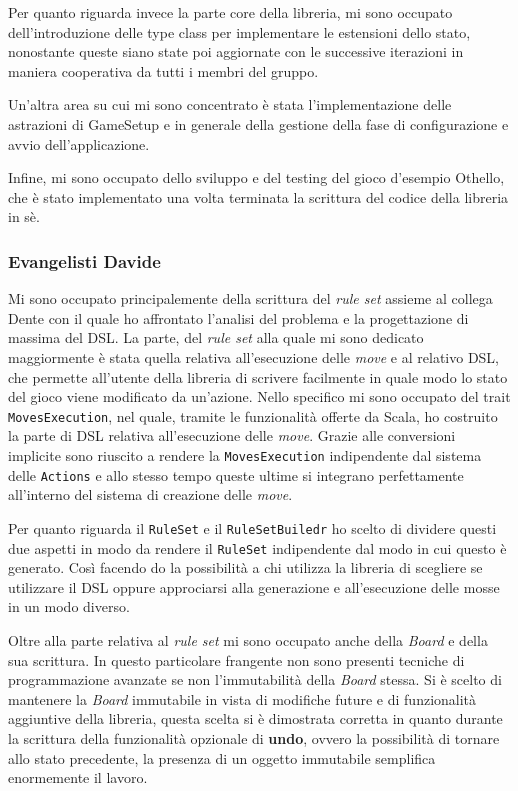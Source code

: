 Per quanto riguarda invece la parte core della libreria, mi sono occupato dell'in\-tro\-du\-zione delle type class per implementare le estensioni dello stato, nonostante queste siano state poi aggiornate con le successive iterazioni in maniera cooperativa da tutti i membri del gruppo.

Un'altra area su cui mi sono concentrato è stata l'implementazione delle astrazioni di GameSetup e in generale della gestione della fase di configurazione e avvio dell'ap\-pli\-ca\-zione.

Infine, mi sono occupato dello sviluppo e del testing del gioco d'esempio Othello, che è stato implementato una volta terminata la scrittura del codice della libreria in sè.

\subsubsection{Evangelisti Davide}
Mi sono occupato principalemente della scrittura del \textit{rule set} assieme al collega Dente con il quale ho affrontato l'analisi del problema e la progettazione di massima del DSL.
%
La parte, del \textit{rule set} alla quale mi sono dedicato maggiormente è stata quella relativa all'esecuzione delle \textit{move} e al relativo DSL, che permette all'utente della libreria di scrivere facilmente in quale modo lo stato del gioco viene modificato da un'azione.
%
Nello specifico mi sono occupato del trait \texttt{MovesExecution}, nel quale, tramite le funzionalità offerte da Scala, ho costruito la parte di DSL relativa all'esecuzione delle \textit{move}.
%
Grazie alle conversioni implicite sono riuscito a rendere la \texttt{MovesExecution} indipendente dal sistema delle \texttt{Actions} e allo stesso tempo queste ultime si integrano perfettamente all'interno del sistema di creazione delle \textit{move}.

Per quanto riguarda il \texttt{RuleSet} e il \texttt{RuleSetBuiledr} ho scelto di dividere questi due aspetti in modo da rendere il \texttt{RuleSet} indipendente dal modo in cui questo è generato.
%
Così facendo do la possibilità a chi utilizza la libreria di scegliere se utilizzare il DSL oppure approciarsi alla generazione e all'esecuzione delle mosse in un modo diverso.

Oltre alla parte relativa al \textit{rule set} mi sono occupato anche della \textit{Board} e della sua scrittura.
%
In questo particolare frangente non sono presenti tecniche di programmazione avanzate se non l'immutabilità della \textit{Board} stessa.
%
Si è scelto di mantenere la \textit{Board} immutabile in vista di modifiche future e di funzionalità aggiuntive della libreria, questa scelta si è dimostrata corretta in quanto durante la scrittura della funzionalità opzionale di \textbf{undo}, ovvero la possibilità di tornare allo stato precedente, la presenza di un oggetto immutabile semplifica enormemente il lavoro.

